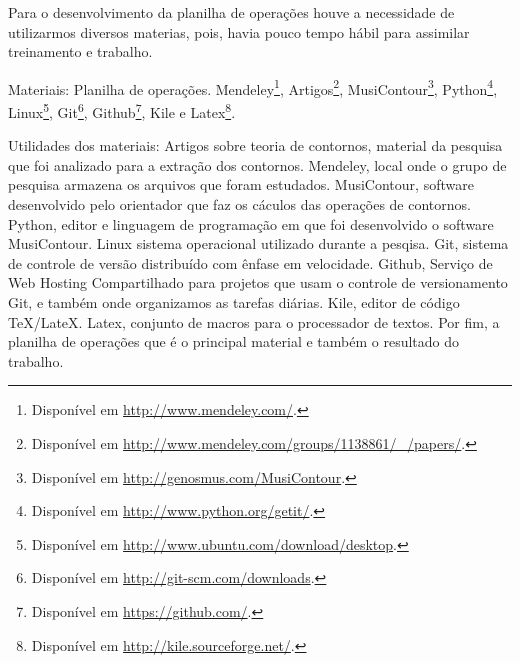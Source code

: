 \documentclass[11pt]{article}
\begin{document}
\label{sec:materiais}



Para o desenvolvimento da planilha de operações houve a necessidade de
utilizarmos diversos materias, pois, havia pouco tempo hábil para assimilar
treinamento e trabalho.


Materiais:
Planilha de operações.
Mendeley\footnote{Disponível em
  \url{http://www.mendeley.com/}.}, Artigos\footnote{Disponível em
  \url{http://www.mendeley.com/groups/1138861/_/papers/}.},
  MusiContour\footnote{Disponível em \url{http://genosmus.com/MusiContour}.},
  Python\footnote{Disponível em  \url{http://www.python.org/getit/}.},
  Linux\footnote{Disponível em
  \url{http://www.ubuntu.com/download/desktop}.},
  Git\footnote{Disponível em
  \url{http://git-scm.com/downloads}.}, Github\footnote{Disponível em
  \url{https://github.com/}.}, Kile e Latex\footnote{Disponível em
  \url{http://kile.sourceforge.net/}.}.

Utilidades dos materiais: Artigos sobre teoria de contornos, material da pesquisa
que foi analizado para a extração dos contornos. Mendeley, local onde o grupo de pesquisa
armazena os arquivos que foram estudados. MusiContour, software desenvolvido pelo orientador
que faz os cáculos das operações de contornos. Python, editor e linguagem de programação em
que foi desenvolvido o software MusiContour. Linux sistema operacional utilizado durante a pesqisa.
Git, sistema de controle de versão distribuído com ênfase em velocidade. Github, Serviço de Web
Hosting Compartilhado para projetos que usam o controle de versionamento Git, e também onde organizamos
as tarefas diárias. Kile, editor de código TeX/LateX. Latex, conjunto de macros para o processador de
textos. Por fim, a planilha de operações que é o principal material e também o resultado do trabalho.
\end{document}
